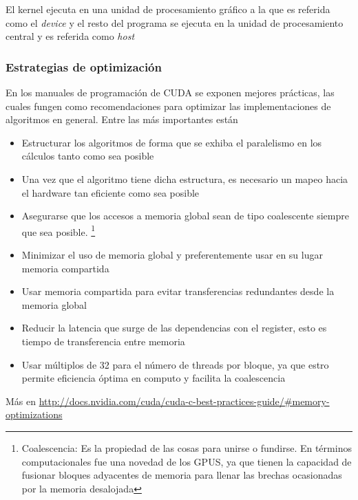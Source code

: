 \documentclass[]{article}
\let\rmarkdownfootnote\footnote%
\def\footnote{\protect\rmarkdownfootnote}
\begin{document}
El kernel ejecuta en una unidad de procesamiento gráfico a la que es
referida como el \emph{device} y el resto del programa se ejecuta en la
unidad de procesamiento central y es referida como \emph{host}

\subsubsection{Estrategias de
optimización}\label{estrategias-de-optimizacion}

En los manuales de programación de CUDA se exponen mejores prácticas,
las cuales fungen como recomendaciones para optimizar las
implementaciones de algoritmos en general. Entre las más importantes
están

\begin{itemize}
\item
  Estructurar los algoritmos de forma que se exhiba el paralelismo en
  los cálculos tanto como sea posible
\item
  Una vez que el algoritmo tiene dicha estructura, es necesario un mapeo
  hacia el hardware tan eficiente como sea posible
\item
  Asegurarse que los accesos a memoria global sean de tipo coalescente
  siempre que sea posible.
  \footnote{Coalescencia: Es la propiedad de las cosas para unirse o fundirse. En términos computacionales fue una novedad de los GPUS, ya que tienen la capacidad de fusionar bloques adyacentes de memoria para llenar las brechas ocasionadas por la memoria desalojada}
\item
  Minimizar el uso de memoria global y preferentemente usar en su lugar
  memoria compartida
\item
  Usar memoria compartida para evitar transferencias redundantes desde
  la memoria global
\item
  Reducir la latencia que surge de las dependencias con el register,
  esto es tiempo de transferencia entre memoria
\item
  Usar múltiplos de 32 para el número de threads por bloque, ya que
  estro permite eficiencia óptima en computo y facilita la coalescencia
\end{itemize}

Más en
\url{http://docs.nvidia.com/cuda/cuda-c-best-practices-guide/#memory-optimizations}
\end{document}

